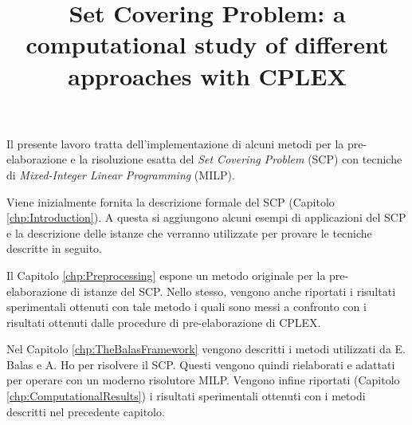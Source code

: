 \documentclass[a4paper,12pt]{mydeitesi_eng}
\begin{document}
\title{Set Covering Problem: a computational study of different approaches with CPLEX​} 

\newcommand{\tr}{\mathrm {tr}}

\newtheorem{teorema}{Teorema}[chapter]
\newtheorem{definizione}{Definizione}[chapter]
\newtheorem{lemma}{Lemma}[chapter]
\newtheorem{proposizione}{Proposizione}[chapter]
\newtheorem{corollario}{Corollario}[chapter]
\newtheorem{condizione}{Condizione}[chapter]
\newtheorem{congettura}{Congettura}[chapter]
\newtheorem{esempio}{Esempio}[chapter]

\maketitle


\tableofcontents
\clearpage

\fancyhead[RO]{}
\fancyfoot[C]{\thepage}

\abstract
Il presente lavoro tratta dell'implementazione di alcuni metodi per la pre-elaborazione e la risoluzione esatta del \emph{Set Covering Problem} (SCP) con tecniche di \emph{Mixed-Integer Linear Programming} (MILP).

Viene inizialmente fornita la descrizione formale del SCP (Capitolo \ref{chp:Introduction}).
A questa si aggiungono alcuni esempi di applicazioni del SCP e la descrizione delle istanze che verranno utilizzate per provare le tecniche descritte in seguito.

Il Capitolo \ref{chp:Preprocessing} espone un metodo originale per la pre-elaborazione di istanze del SCP.
Nello stesso, vengono anche riportati i risultati sperimentali ottenuti con tale metodo i quali sono messi a confronto con i risultati ottenuti dalle procedure di pre-elaborazione di CPLEX.

Nel Capitolo \ref{chp:TheBalasFramework} vengono descritti i metodi utilizzati da E. Balas e A. Ho \cite{Balas1980-CuttinPlanes} \cite{Balas1980-Computational} per risolvere il SCP.
Questi vengono quindi rielaborati e adattati per operare con un moderno risolutore MILP.
Vengono infine riportati (Capitolo \ref{chp:ComputationalResults}) i risultati sperimentali ottenuti con i metodi descritti nel precedente capitolo.\\
\end{document}
